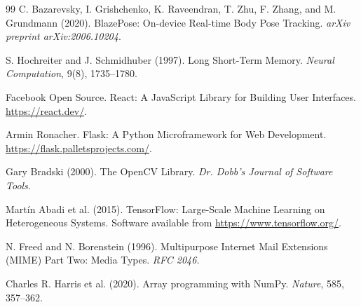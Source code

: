 \documentclass[12pt,a4paper]{report}
\begin{document}
\begin{thebibliography}{99}
C. Bazarevsky, I. Grishchenko, K. Raveendran, T. Zhu, F. Zhang, and M. Grundmann (2020).
BlazePose: On-device Real-time Body Pose Tracking.
\textit{arXiv preprint arXiv:2006.10204}.

S. Hochreiter and J. Schmidhuber (1997).
Long Short-Term Memory.
\textit{Neural Computation}, 9(8), 1735--1780.

Facebook Open Source.
React: A JavaScript Library for Building User Interfaces.
\url{https://react.dev/}.

Armin Ronacher.
Flask: A Python Microframework for Web Development.
\url{https://flask.palletsprojects.com/}.

Gary Bradski (2000).
The OpenCV Library.
\textit{Dr. Dobb's Journal of Software Tools}.

Mart\'in Abadi et al. (2015).
TensorFlow: Large-Scale Machine Learning on Heterogeneous Systems.
Software available from \url{https://www.tensorflow.org/}.

N. Freed and N. Borenstein (1996).
Multipurpose Internet Mail Extensions (MIME) Part Two: Media Types.
\textit{RFC 2046}.

Charles R. Harris et al. (2020).
Array programming with NumPy.
\textit{Nature}, 585, 357--362.
\end{thebibliography}
\end{document}
